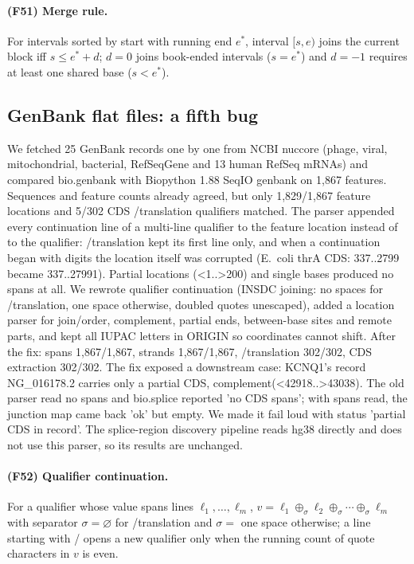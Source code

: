 \paragraph{(F51) Merge rule.} For intervals sorted by start with running end $e^*$, interval $[s,e)$ joins the current block iff $s\le e^*+d$; $d=0$ joins book-ended intervals ($s=e^*$) and $d=-1$ requires at least one shared base ($s<e^*$).
\subsection{GenBank flat files: a fifth bug}
We fetched 25 GenBank records one by one from NCBI nuccore (phage, viral, mitochondrial, bacterial, RefSeqGene and 13 human RefSeq mRNAs) and compared bio.genbank with Biopython 1.88 SeqIO genbank on 1,867 features. Sequences and feature counts already agreed, but only 1,829/1,867 feature locations and 5/302 CDS /translation qualifiers matched. The parser appended every continuation line of a multi-line qualifier to the feature location instead of to the qualifier: /translation kept its first line only, and when a continuation began with digits the location itself was corrupted (E.~coli thrA CDS: 337..2799 became 337..27991). Partial locations (<1..>200) and single bases produced no spans at all. We rewrote qualifier continuation (INSDC joining: no spaces for /translation, one space otherwise, doubled quotes unescaped), added a location parser for join/order, complement, partial ends, between-base sites and remote parts, and kept all IUPAC letters in ORIGIN so coordinates cannot shift. After the fix: spans 1,867/1,867, strands 1,867/1,867, /translation 302/302, CDS extraction 302/302.
The fix exposed a downstream case: KCNQ1's record NG\_016178.2 carries only a partial CDS, complement(<42918..>43038). The old parser read no spans and bio.splice reported 'no CDS spans'; with spans read, the junction map came back 'ok' but empty. We made it fail loud with status 'partial CDS in record'. The splice-region discovery pipeline reads hg38 directly and does not use this parser, so its results are unchanged.
\paragraph{(F52) Qualifier continuation.} For a qualifier whose value spans lines $\ell_1,\dots,\ell_m$, $v=\ell_1\oplus_\sigma\ell_2\oplus_\sigma\cdots\oplus_\sigma\ell_m$ with separator $\sigma=\varnothing$ for /translation and $\sigma=$ one space otherwise; a line starting with / opens a new qualifier only when the running count of quote characters in $v$ is even.
